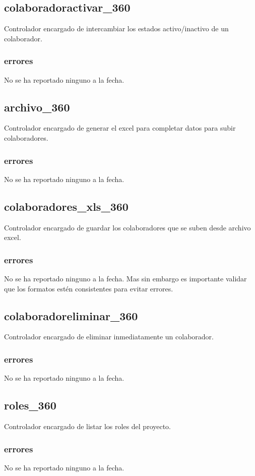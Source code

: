 \documentclass[10pt,a4paper]{book}
\begin{document}
	\subsection{colaboradoractivar\_360}
	Controlador encargado de intercambiar los estados activo/inactivo de un colaborador.
	\subsubsection{errores}
	No se ha reportado ninguno a la fecha.
	
	\subsection{archivo\_360}
	Controlador encargado de generar el excel para completar datos para subir colaboradores.
	\subsubsection{errores}
	No se ha reportado ninguno a la fecha.
	
	\subsection{colaboradores\_xls\_360}
	Controlador encargado de guardar los colaboradores que se suben desde archivo excel.
	\subsubsection{errores}
	No se ha reportado ninguno a la fecha. Mas sin embargo es importante validar que los formatos estén consistentes para evitar errores.
	
	\subsection{colaboradoreliminar\_360}
	Controlador encargado de eliminar inmediatamente un colaborador.
	\subsubsection{errores}
	No se ha reportado ninguno a la fecha.
	
	\subsection{roles\_360}
	Controlador encargado de listar los roles del proyecto.
	\subsubsection{errores}
	No se ha reportado ninguno a la fecha.
	
\end{document}

